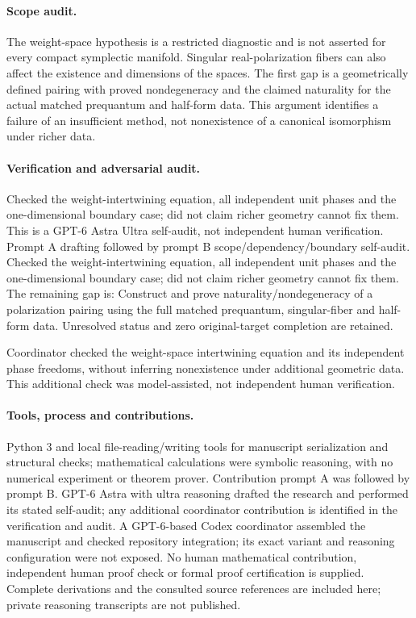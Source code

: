 \documentclass[11pt]{article}
\begin{document}
\paragraph{Scope audit.} The weight-space hypothesis is a restricted diagnostic and is not asserted for every compact symplectic manifold. Singular real-polarization fibers can also affect the existence and dimensions of the spaces. The first gap is a geometrically defined pairing with proved nondegeneracy and the claimed naturality for the actual matched prequantum and half-form data. This argument identifies a failure of an insufficient method, not nonexistence of a canonical isomorphism under richer data.

\paragraph{Verification and adversarial audit.}
Checked the weight-intertwining equation, all independent unit phases and the one-dimensional boundary case; did not claim richer geometry cannot fix them. This is a GPT-6 Astra Ultra self-audit, not independent human verification. Prompt A drafting followed by prompt B scope/dependency/boundary self-audit. Checked the weight-intertwining equation, all independent unit phases and the one-dimensional boundary case; did not claim richer geometry cannot fix them. The remaining gap is: Construct and prove naturality/nondegeneracy of a polarization pairing using the full matched prequantum, singular-fiber and half-form data. Unresolved status and zero original-target completion are retained.

Coordinator checked the weight-space intertwining equation and its independent phase freedoms, without inferring nonexistence under additional geometric data. This additional check was model-assisted, not independent human verification.

\paragraph{Tools, process and contributions.}
Python 3 and local file-reading/writing tools for manuscript serialization and structural checks; mathematical calculations were symbolic reasoning, with no numerical experiment or theorem prover. Contribution prompt A was followed by prompt B. GPT-6 Astra with ultra reasoning drafted the research and performed its stated self-audit; any additional coordinator contribution is identified in the verification and audit. A GPT-6-based Codex coordinator assembled the manuscript and checked repository integration; its exact variant and reasoning configuration were not exposed. No human mathematical contribution, independent human proof check or formal proof certification is supplied. Complete derivations and the consulted source references are included here; private reasoning transcripts are not published.
\end{document}
